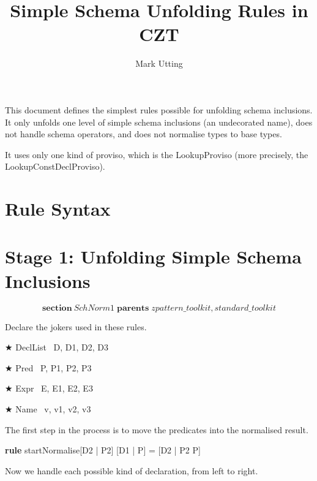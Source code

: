 \documentclass{article}
\title{Simple Schema Unfolding Rules in CZT}
\author{Mark Utting}
\newenvironment{zsection}{\[}{\]}
\newcommand{\SECTION}{\textbf{section}~}
\newcommand{\parents}{\mathrel{\textbf{parents}}}
\newenvironment{zedrule}[1]{\par\textbf{rule }#1\vspace{-1ex}\infrule}{\endinfrule}
\newcommand{\derives}{\derive{}}
\newenvironment{zedjoker}[1]{\par$\bigstar$ #1\ }{}
\begin{document}
\maketitle

This document defines the simplest rules possible for
unfolding schema inclusions.  It only unfolds one level of simple schema
inclusions (an undecorated name), does not handle
schema operators, and does not normalise types to base types.

It uses only one kind of proviso, which is the LookupProviso
(more precisely, the LookupConstDeclProviso).

\section*{Rule Syntax}

\section*{Stage 1: Unfolding Simple Schema Inclusions}

\begin{zsection}
  \SECTION SchNorm1 \parents zpattern\_toolkit, standard\_toolkit
\end{zsection}

Declare the jokers used in these rules.

\begin{zedjoker}{DeclList} D, D1, D2, D3 \end{zedjoker} \\
\begin{zedjoker}{Pred} P, P1, P2, P3 \end{zedjoker} \\
\begin{zedjoker}{Expr} E, E1, E2, E3 \end{zedjoker} \\
\begin{zedjoker}{Name} v, v1, v2, v3 \end{zedjoker} \\

\newcommand{\unfoldsTo}{\mathrel{\leadsto}}

The first step in the process is to move the predicates into
the normalised result.
\begin{zedrule}{startNormalise}
   [D1 | true] \unfoldsTo [D2 | P2]
\derives
   [D1 | P] = [D2 | P2 \land P]
\end{zedrule}

Now we handle each possible kind of declaration, from left to right.
\end{document}
